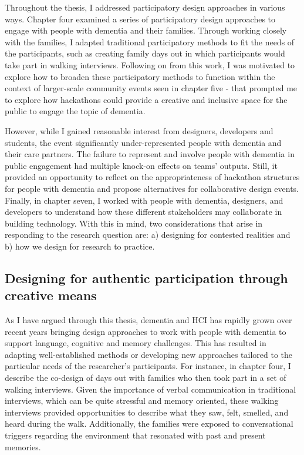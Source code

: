 Throughout the thesis, I addressed participatory design approaches in various ways. Chapter four examined a series of participatory design approaches to engage with people with dementia and their families. Through working closely with the families, I adapted traditional participatory methods to fit the needs of the participants, such as creating family days out in which participants would take part in walking interviews. Following on from this work, I was motivated to explore how to broaden these participatory methods to function within the context of larger-scale community events seen in chapter five - that prompted me to explore how hackathons could provide a creative and inclusive space for the public to engage the topic of dementia. 

However, while I gained reasonable interest from designers, developers and students, the event significantly under-represented people with dementia and their care partners. The failure to represent and involve people with dementia in public engagement had multiple knock-on effects on teams' outputs. Still, it provided an opportunity to reflect on the appropriateness of hackathon structures for people with dementia and propose alternatives for collaborative design events. Finally, in chapter seven, I worked with people with dementia, designers, and developers to understand how these different stakeholders may collaborate in building technology. With this in mind, two considerations that arise in responding to the research question are: a) designing for contested realities and b) how we design for research to practice.

\subsection{Designing for authentic participation through creative means}
\label{RQ1:Creativity}
As I have argued through this thesis, dementia and HCI has rapidly grown over recent years bringing design approaches to work with people with dementia to support language, cognitive and memory challenges. This has resulted in adapting well-established methods or developing new approaches tailored to the particular needs of the researcher's participants. For instance, in chapter four, I describe the co-design of days out with families who then took part in a set of walking interviews. Given the importance of verbal communication in traditional interviews, which can be quite stressful and memory oriented, these walking interviews provided opportunities to describe what they saw, felt, smelled, and heard during the walk. Additionally, the families were exposed to conversational triggers regarding the environment that resonated with past and present memories.

